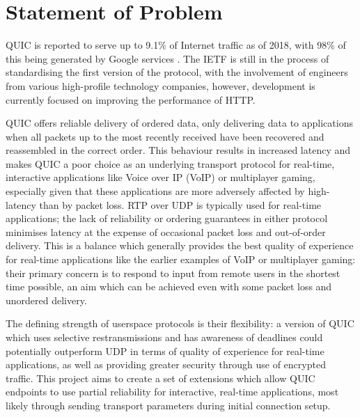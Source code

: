 \documentclass{mprop}
\begin{document}

\newpage

\section{Statement of Problem}


QUIC is reported to serve up to 9.1\% of Internet traffic as of 2018, with 98\% of this being 
generated by Google services \cite {Ruth2018}. The IETF is still in the process of standardising 
the first version of the protocol, with the involvement of engineers from various high-profile 
technology companies, however, development is currently focused on improving the performance of 
HTTP.

QUIC offers reliable delivery of ordered data, only delivering data to 
applications when all packets up to the most recently received have been recovered and 
reassembled in the correct order. This behaviour results in increased latency and makes QUIC a 
poor choice as an underlying transport protocol for real-time, interactive applications like 
Voice over IP (VoIP) or multiplayer gaming, especially given that these applications are more 
adversely affected by high-latency than by packet loss. RTP over UDP is typically used for real-time applications; the lack of reliability or ordering guarantees in either protocol minimises latency at the expense of occasional packet loss and out-of-order delivery. This is a balance which generally provides the best quality of experience for real-time applications like the earlier examples of VoIP or multiplayer gaming: their primary concern is to respond to input from remote users in the shortest time possible, an aim which can be achieved even with some packet loss and unordered delivery.

The defining strength of userspace protocols is their flexibility: a version of QUIC 
which uses selective restransmissions and has awareness of deadlines could potentially outperform 
UDP in terms of quality of experience for real-time applications, as well as providing greater 
security through use of encrypted traffic. This project aims to create a set of extensions which 
allow QUIC endpoints to use partial reliability for interactive, real-time applications, most 
likely through sending transport parameters during initial connection setup.
\end{document}
